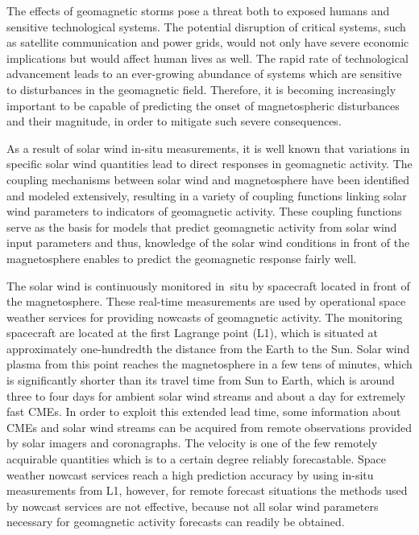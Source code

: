 The effects of geomagnetic storms pose a threat both to exposed humans and sensitive technological systems. The potential disruption of critical systems, such as satellite communication and power grids, would not only have severe economic implications but would affect human lives as well. The rapid rate of technological advancement leads to an ever-growing abundance of systems which are sensitive to disturbances in the geomagnetic field. Therefore, it is becoming increasingly important to be capable of predicting the onset of magnetospheric disturbances and their magnitude, in order to mitigate such severe consequences.

\pagebreak

As a result of solar wind in-situ measurements, it is well known that variations in specific solar wind quantities lead to direct responses in geomagnetic activity. The coupling mechanisms between solar wind and magnetosphere have been identified and modeled extensively, resulting in a variety of coupling functions linking solar wind parameters to indicators of geomagnetic activity. These coupling functions serve as the basis for models that predict geomagnetic activity from solar wind input parameters and thus, knowledge of the solar wind conditions in front of the magnetosphere enables to predict the geomagnetic response fairly well.

The solar wind is continuously monitored in~situ by spacecraft located in front of the magnetosphere. These real-time measurements are used by operational space weather services for providing nowcasts of geomagnetic activity. The monitoring spacecraft are located at the first Lagrange point (L1), which is situated at approximately one-hundredth the distance from the Earth to the Sun.
Solar wind plasma from this point reaches the magnetosphere in a few tens of minutes, which is significantly shorter than its  travel time from Sun to Earth, which is around three to four days for ambient solar wind streams and about a day for extremely fast CMEs.
In order to exploit this extended lead time, some information about CMEs and solar wind streams can be acquired from remote observations provided by solar imagers and coronagraphs. The velocity is one of the few remotely acquirable quantities which is to a certain degree reliably forecastable.
Space weather nowcast services reach a high prediction accuracy by using in-situ measurements from L1, however, for remote forecast situations the methods used by nowcast services are not effective, because not all solar wind parameters necessary for geomagnetic activity forecasts can readily be obtained.

